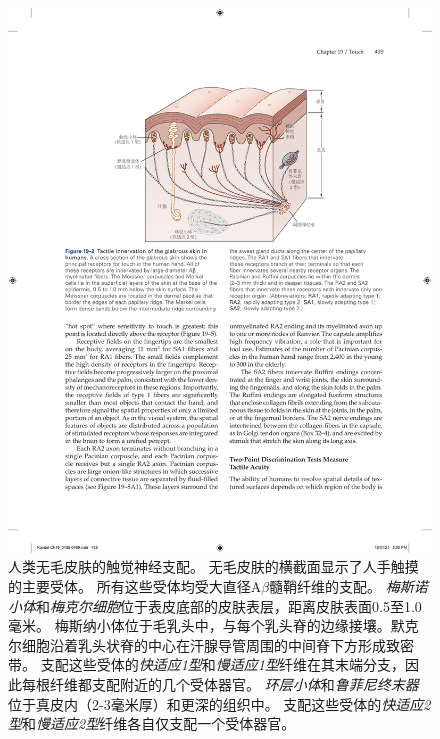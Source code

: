 \begin{figure}[htbp]
	\centering
	\includegraphics[width=0.85\linewidth]{chap19/fig_19_2}
	\caption{人类无毛皮肤的触觉神经支配。
		无毛皮肤的横截面显示了人手触摸的主要受体。
		所有这些受体均受大直径A$\beta$髓鞘纤维的支配。
		\textit{梅斯诺小体}和\textit{梅克尔细胞}位于表皮底部的皮肤表层，距离皮肤表面0.5至1.0毫米。
		梅斯纳小体位于毛乳头中，与每个乳头脊的边缘接壤。默克尔细胞沿着乳头状脊的中心在汗腺导管周围的中间脊下方形成致密带。
		支配这些受体的\textit{快适应1型}和\textit{慢适应1型}纤维在其末端分支，因此每根纤维都支配附近的几个受体器官。
		\textit{环层小体}和\textit{鲁菲尼终末器}位于真皮内（2-3毫米厚）和更深的组织中。
		支配这些受体的\textit{快适应2型}和\textit{慢适应2型}纤维各自仅支配一个受体器官。}
	\label{fig:19_2}
\end{figure}


